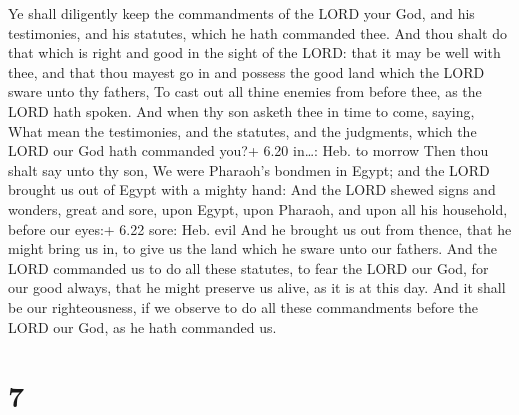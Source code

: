  Ye shall diligently keep the commandments of the LORD your
God, and his testimonies, and his statutes, which he hath commanded
thee.  And thou shalt do that which is right and good in
the sight of the LORD: that it may be well with thee, and that thou
mayest go in and possess the good land which the LORD sware unto thy
fathers,  To cast out all thine enemies from before thee,
as the LORD hath spoken.  And when thy son asketh thee in
time to come, saying, What mean the testimonies, and the statutes, and
the judgments, which the LORD our God hath commanded you?+ 6.20
in\ldots: Heb. to morrow  Then thou shalt say unto thy son,
We were Pharaoh's bondmen in Egypt; and the LORD brought us out of Egypt
with a mighty hand:  And the LORD shewed signs and wonders,
great and sore, upon Egypt, upon Pharaoh, and upon all his household,
before our eyes:+ 6.22 sore: Heb. evil  And he brought us
out from thence, that he might bring us in, to give us the land which he
sware unto our fathers.  And the LORD commanded us to do
all these statutes, to fear the LORD our God, for our good always, that
he might preserve us alive, as it is at this day.  And it
shall be our righteousness, if we observe to do all these commandments
before the LORD our God, as he hath commanded us.

\hypertarget{section-6}{%
\section{7}\label{section-6}}

